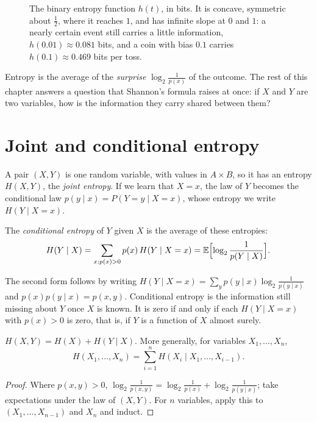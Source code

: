 \begin{figure}[ht]
\centering
{}
\caption{The binary entropy function $h(t)$, in bits. It is concave, symmetric about $\frac12$, where it reaches $1$, and has infinite slope at $0$ and $1$: a nearly certain event still carries a little information, $h(0.01)\approx0.081$ bits, and a coin with bias $0.1$ carries $h(0.1)\approx0.469$ bits per toss.}
\label{fig:binaryentropy}
\end{figure}

Entropy is the average of the \emph{surprise} $\log_2\frac1{p(x)}$ of the outcome. The rest of this chapter answers a question that Shannon's formula raises at once: if $X$ and $Y$ are two variables, how is the information they carry shared between them?

\section{Joint and conditional entropy}\label{sec:conditional}

A pair $(X,Y)$ is one random variable, with values in $A\times B$, so it has an entropy $H(X,Y)$, the \emph{joint entropy}. If we learn that $X=x$, the law of $Y$ becomes the conditional law $p(y\mid x)=P(Y=y\mid X=x)$, whose entropy we write $H(Y\mid X=x)$.

\begin{definition}\label{def:condentropy}
The \emph{conditional entropy} of $Y$ given $X$ is the average of these entropies:
\[
H(Y\mid X)=\sum_{x:p(x)>0}p(x)\,H(Y\mid X=x)=\mathbb E\Bigl[\log_2\frac1{p(Y\mid X)}\Bigr].
\]
\end{definition}

The second form follows by writing $H(Y\mid X=x)=\sum_yp(y\mid x)\log_2\frac1{p(y\mid x)}$ and $p(x)p(y\mid x)=p(x,y)$. Conditional entropy is the information still missing about $Y$ once $X$ is known. It is zero if and only if each $H(Y\mid X=x)$ with $p(x)>0$ is zero, that is, if $Y$ is a function of $X$ almost surely.

\begin{proposition}\label{prop:chain}
$H(X,Y)=H(X)+H(Y\mid X)$. More generally, for variables $X_1,\dots,X_n$,
\[
H(X_1,\dots,X_n)=\sum_{i=1}^nH(X_i\mid X_1,\dots,X_{i-1}).
\]
\end{proposition}

\begin{proof}
Where $p(x,y)>0$, $\log_2\frac1{p(x,y)}=\log_2\frac1{p(x)}+\log_2\frac1{p(y\mid x)}$; take expectations under the law of $(X,Y)$. For $n$ variables, apply this to $(X_1,\dots,X_{n-1})$ and $X_n$ and induct.
\end{proof}

